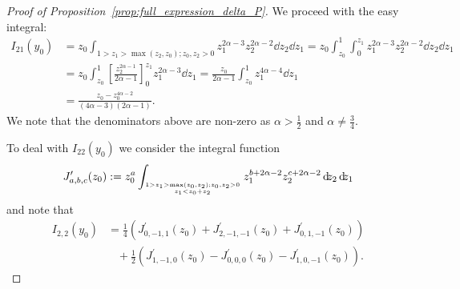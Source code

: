 \begin{proof}[Proof of Proposition~\ref{prop:full_expression_delta_P}]
We proceed with the easy integral:
\begin{align*}
	I_{21}(y_0) &= z_0 \int_{1>z_1>\max(z_2,z_0);z_0,z_2>0} z_1^{2\alpha-3} z_2^{2\alpha-2} {\dd}z_2{\dd}z_1   
		= z_0 \int_{z_0}^1 \int_{0}^{z_1} z_1^{2\alpha-3} z_2^{2\alpha-2} {\dd}z_2{\dd}z_1\\
	&= z_0 \int_{z_0}^1 \left[ \frac{z_2^{2\alpha-1}}{2\alpha-1}\right]_{0}^{z_1} z_1^{2\alpha-3} {\dd}z_1 
		= \frac{z_0}{2\alpha-1}  \int_{z_0}^1 z_1^{4\alpha-4} {\dd}z_1 \\
	&= \frac{z_0 - z_0^{4\alpha-2}}{(4\alpha-3)(2\alpha-1)}.
\end{align*}
We note that the denominators above are non-zero as $\alpha > \frac{1}{2}$ and $\alpha \not =\frac{3}{4}$.

To deal with $I_{22}(y_0)$ we consider the integral function
\[
	J_{a,b,c}^\prime(z_0) := z_0^a \int_{{1>z_1>\max(z_0,z_2); z_0,z_2>0}\atop{z_1 < z_0+z_2}} z_1^{b+2\alpha-2} z_2^{c+2\alpha-2} {\operatorname{\, \mathrm{d}\hspace{-2pt}}}z_2{\operatorname{\, \mathrm{d}\hspace{-2pt}}}z_1
\]
and note that
\begin{equation}\label{eq:Delta_P_computation_I22_J}
\begin{aligned}
		I_{2,2}(y_0) &= \frac{1}{4}\left(J_{0,-1,1}^\prime(z_0) + J_{2,-1,-1}^\prime(z_0)
		+ J_{0,1,-1}^\prime(z_0)\right) \\
		&\hspace{10pt}+ \frac{1}{2}\left( J_{1,-1,0}^\prime(z_0) - J_{0,0,0}^\prime(z_0) - J_{1,0,-1}^\prime(z_0)\right).
\end{aligned}
\end{equation}


\end{proof}
